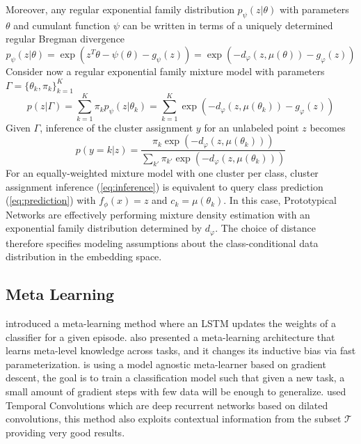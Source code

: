 \documentclass{article}
\begin{document}
Moreover, any regular exponential family distribution $p_{\psi}(z|\theta)$ with parameters $\theta$ and cumulant function $\psi$ can be written in terms of a uniquely determined regular Bregman divergence
\begin{equation}
p_{\psi}(z|\theta)=\exp(z^T\theta-\psi(\theta)-g_{\psi}(z))=\exp(-d_\varphi(z,\mu(\theta))-g_{\varphi}(z))
\end{equation}
Consider now a regular exponential family mixture model with parameters $\Gamma=\{\theta_k,\pi_k\}_{k=1}^K$
\begin{equation}
p(z|\Gamma)=\sum_{k=1}^K\pi_k p_{\psi}(z|\theta_k)=\sum_{k=1}^K\exp(-d_{\varphi}(z,\mu(\theta_k))-g_{\varphi}(z))
\end{equation}
Given $\Gamma$, inference of the cluster assignment $y$ for an unlabeled point $z$ becomes
\begin{equation}\label{eq:inference}
p(y=k|z)=\frac{\pi_k\exp(-d_{\varphi}(z,\mu(\theta_k)))}{\sum_{k'}\pi_{k'}\exp(-d_{\varphi}(z,\mu(\theta_k)))}
\end{equation}
For an equally-weighted mixture model with one cluster per class, cluster assignment inference (\ref{eq:inference}) is equivalent to query class prediction (\ref{eq:prediction}) with $f_{\phi}(x)=z$ and $c_k=\mu(\theta_k)$. In this case, Prototypical Networks are effectively performing mixture density estimation with an exponential family distribution determined by $d_{\varphi}$. The choice of distance therefore specifies modeling assumptions about the class-conditional data distribution in the embedding space.

\subsection{Meta Learning}

\cite{ravi2016optimization} introduced a meta-learning method where an LSTM updates the weights of a classifier for a given episode. \cite{munkhdalai2017meta} also presented a meta-learning architecture that learns meta-level knowledge across tasks, and it changes its inductive bias via fast parameterization. \cite{finn2017model} is using a model agnostic meta-learner based on gradient descent, the goal is to train a classification model such that given a new task, a small amount of gradient steps with few data will be enough to generalize. \cite{mishra2017meta} used Temporal Convolutions which are deep recurrent networks based on dilated convolutions, this method also exploits contextual information from the subset $\mathcal{T}$ providing very good results.
\end{document}
